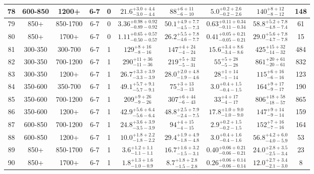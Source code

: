 \documentclass[11pt, oneside]{article}
\begin{document}
\begin{table}
{\begin{tabular}{ |c|c|c|c|c||c|c|c||c|c| }
78 & 600-850 & 1200+ & 6-7 & 0 & $21.6^{+3.0+4.4}_{-3.0-4.4}$ & $88^{+ 6+11}_{- 6-10}$ & $5.0^{+0.2+2.6}_{-0.2-2.6}$ & $140^{+ 8+12}_{- 8-12}$ & 148 \\ \hline
79 & 850+ & 850-1700 & 6-7 & 0 & $3.36^{+0.98+0.92}_{-0.89-0.92}$ & $50.1^{+4.9+7.7}_{-4.5-7.3}$ & $0.63^{+0.11+0.34}_{-0.11-0.34}$ & $58.8^{+5.2+7.8}_{-4.8-7.4}$ & 61 \\ \hline
80 & 850+ & 1700+ & 6-7 & 0 & $1.11^{+0.65+0.57}_{-0.50-0.57}$ & $26.2^{+5.5+7.8}_{-4.6-7.7}$ & $0.41^{+0.05+0.21}_{-0.05-0.21}$ & $29.0^{+5.6+7.8}_{-4.7-7.8}$ & 15 \\ \hline
81 & 300-350 & 300-700 & 6-7 & 1 & $129^{+ 8+16}_{- 8-16}$ & $147^{+ 4+24}_{- 4-24}$ & $15.6^{+3.4+8.6}_{-3.4-8.6}$ & $425^{+15+32}_{-14-32}$ & 484 \\ \hline
82 & 300-350 & 700-1200 & 6-7 & 1 & $290^{+11+36}_{-11-36}$ & $219^{+ 5+32}_{- 5-31}$ & $55^{+ 5+28}_{- 5-28}$ & $861^{+20+61}_{-20-61}$ & 832 \\ \hline
83 & 300-350 & 1200+ & 6-7 & 1 & $26.7^{+3.3+3.9}_{-3.3-3.9}$ & $28.0^{+2.0+4.8}_{-1.9-4.6}$ & $28^{+ 1+14}_{- 1-14}$ & $115^{+ 6+16}_{- 6-16}$ & 123 \\ \hline
84 & 350-600 & 350-700 & 6-7 & 1 & $49.1^{+5.7+9.1}_{-5.7-9.1}$ & $75^{+ 3+13}_{- 3-13}$ & $3.0^{+0.4+1.5}_{-0.4-1.5}$ & $164^{+ 9+17}_{- 9-17}$ & 190 \\ \hline
85 & 350-600 & 700-1200 & 6-7 & 1 & $209^{+ 9+26}_{- 9-26}$ & $307^{+ 6+44}_{- 6-43}$ & $33^{+ 4+17}_{- 4-17}$ & $806^{+18+58}_{-18-57}$ & 865 \\ \hline
86 & 350-600 & 1200+ & 6-7 & 1 & $42.9^{+5.6+6.4}_{-5.6-6.4}$ & $48.8^{+2.5+7.9}_{-2.4-7.5}$ & $17.8^{+1.0+9.0}_{-1.0-9.0}$ & $147^{+ 9+14}_{- 9-14}$ & 159 \\ \hline
87 & 600-850 & 700-1200 & 6-7 & 1 & $24.8^{+3.6+3.9}_{-3.5-3.9}$ & $94^{+ 4+15}_{- 4-15}$ & $2.9^{+0.2+1.5}_{-0.2-1.5}$ & $152^{+ 7+16}_{- 7-16}$ & 164 \\ \hline
88 & 600-850 & 1200+ & 6-7 & 1 & $10.0^{+1.8+2.2}_{-1.8-2.2}$ & $29.4^{+1.9+4.9}_{-1.8-4.8}$ & $3.0^{+0.4+1.6}_{-0.4-1.6}$ & $56.8^{+4.2+6.0}_{-4.0-5.9}$ & 53 \\ \hline
89 & 850+ & 850-1700 & 6-7 & 1 & $3.6^{+1.2+1.1}_{-1.1-1.1}$ & $16.7^{+1.6+3.2}_{-1.5-3.1}$ & $0.40^{+0.06+0.21}_{-0.06-0.21}$ & $24.0^{+2.8+3.5}_{-2.5-3.4}$ & 23 \\ \hline
90 & 850+ & 1700+ & 6-7 & 1 & $1.8^{+1.3+1.6}_{-1.0-0.9}$ & $8.7^{+1.8+2.8}_{-1.5-2.8}$ & $0.26^{+0.06+0.14}_{-0.06-0.14}$ & $12.0^{+2.7+3.4}_{-2.1-3.0}$ & 8 \\ \hline

\end{tabular}}
\end{table}
\end{document}

